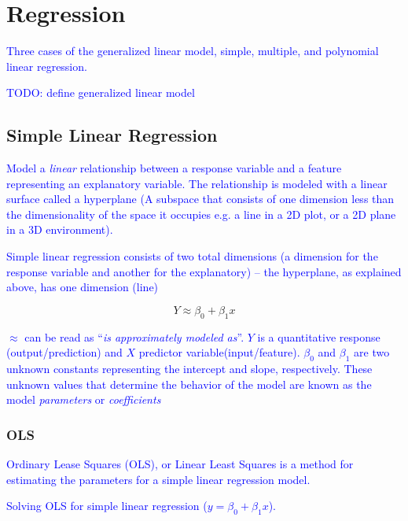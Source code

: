 \section{Regression}

\textcolor{blue}{Three cases of the {generalized linear model}, simple, multiple, and polynomial linear regression.}

\textcolor{blue}{TODO: define generalized linear model}

\subsection{Simple Linear Regression}

\textcolor{blue}{Model a \emph{linear} relationship between a response variable and a feature representing an explanatory variable. The relationship is modeled with a linear surface called a hyperplane (A subspace that consists of one dimension less than the dimensionality of the space it occupies e.g. a line in a 2D plot, or a 2D plane in a 3D environment).}

\textcolor{blue}{Simple linear regression consists of two total dimensions (a dimension for the response variable and another for the explanatory) -- the hyperplane, as explained above, has one dimension (line)}

\begin{equation}
{Y \approx \beta_0 + \beta_1 x}
\label{eq:slr_ex}
\end{equation}

\textcolor{blue}{$\approx$ can be read as ``\emph{is approximately modeled as}''. $Y$ is a quantitative response (output/prediction) and $X$ predictor variable(input/feature). $\beta_0$ and $\beta_1$ are two unknown constants representing the intercept and slope, respectively. These unknown values that determine the behavior of the model are known as the model \emph{parameters} or \emph{coefficients}}

\subsubsection{OLS}

\textcolor{blue}{{Ordinary Lease Squares (OLS)}, or {Linear Least Squares} is a method for estimating the parameters for a simple linear regression model.}

\textcolor{blue}{Solving OLS for simple linear regression ($y=\beta_0 + \beta_1 x$).}

